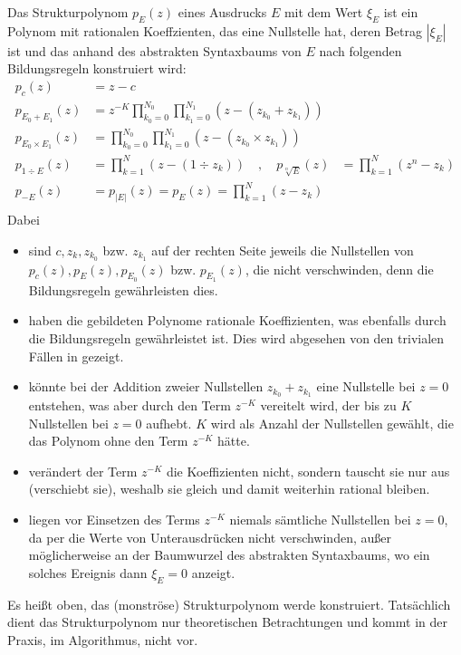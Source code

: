 \pagebreak
\begin{definition}[Strukturpolynom]\label{de:Strukturpolynom}
Das Strukturpolynom $p_E(z)$ eines Ausdrucks $E$
mit dem Wert $\xi_E$
ist ein Polynom mit rationalen Koeffzienten,
das eine Nullstelle hat, deren Betrag $|\xi_E|$ ist
und das anhand des abstrakten Syntaxbaums von $E$
nach folgenden Bildungsregeln konstruiert wird:
\begin{equation*}
\begin{split}
p_{c            }(z) & = z-c \\
p_{E_0+      E_1}(z) & = z^{-K}\prod_{k_0=0}^{N_0}\prod_{k_1=0}^{N_1} (z-(z_{k_0}+z_{k_1})) \\
p_{E_0\times E_1}(z) & = \prod_{k_0=0}^{N_0}\prod_{k_1=0}^{N_1} (z-(z_{k_0}\times z_{k_1}))\\
p_{1  \div   E  }(z) & = \prod_{k=1}^N (z-(1\div z_k)) \quad,\quad
p_{\sqrt[n]{E}  }(z) & = \prod_{k=1}^N (z^n-z_k) \\
p_{-E}(z) & = p_{|E|}(z)  = p_E(z) = \prod_{k=1}^N (z-z_k)\\
\end{split}
\end{equation*}
Dabei
\begin{itemize}
\item sind $c, z_k, z_{k_0}$ bzw. $z_{k_1}$ auf der rechten Seite 
      jeweils die Nullstellen 
      von $p_c(z), p_E(z), p_{E_0}(z)$ bzw. $p_{E_1}(z)$,
      die nicht verschwinden, denn die Bildungsregeln 
	  gewährleisten dies.
\item haben die gebildeten Polynome rationale Koeffizienten,
      was ebenfalls durch die Bildungsregeln gewährleistet ist.
      Dies wird abgesehen von den trivialen Fällen
	  in  gezeigt.
\item könnte bei der Addition zweier Nullstellen $z_{k_0}+z_{k_1}$
      eine Nullstelle bei $z=0$ entstehen,
	  was aber durch den Term $z^{-K}$ vereitelt wird,
	  der bis zu $K$ Nullstellen bei $z=0$ aufhebt.
	  $K$ wird als Anzahl der Nullstellen gewählt,
      die das Polynom ohne den Term $z^{-K}$ hätte.
\item verändert der Term $z^{-K}$ die Koeffizienten nicht,
      sondern tauscht sie nur aus (verschiebt sie), 
	  weshalb sie gleich und damit weiterhin rational bleiben.
\item liegen vor Einsetzen des Terms $z^{-K}$ 
      niemals sämtliche Nullstellen bei $z=0$,
      da per  
      die Werte von Unterausdrücken nicht verschwinden,
      außer möglicherweise an der Baumwurzel 
	  des abstrakten Syntaxbaums,
      wo ein solches Ereignis dann $\xi_E=0$ anzeigt.
\end{itemize}
\begin{note}
Es heißt oben, das (monströse) Strukturpolynom werde konstruiert.
Tatsächlich dient das Strukturpolynom nur theoretischen Betrachtungen
und kommt in der Praxis, im Algorithmus, nicht vor.
\end{note}
\end{definition}


